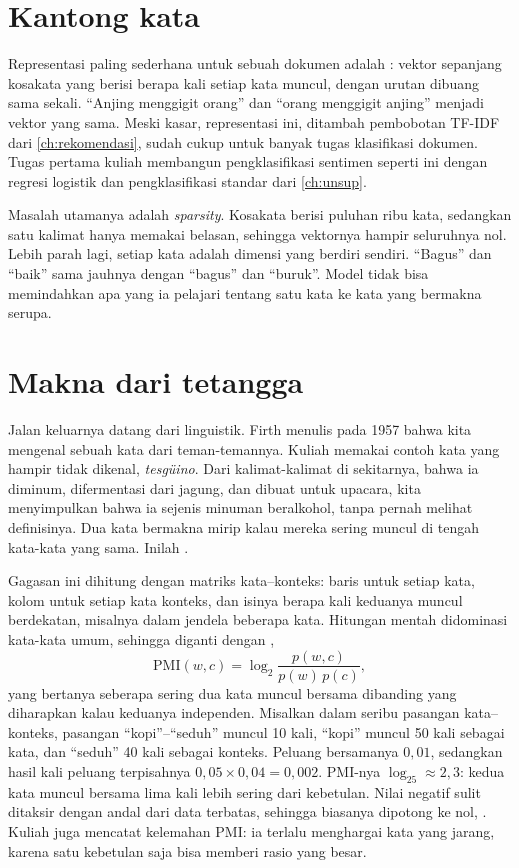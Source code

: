 \section{Kantong kata}

Representasi paling sederhana untuk sebuah dokumen adalah : vektor sepanjang kosakata yang berisi berapa
kali setiap kata muncul, dengan urutan dibuang sama sekali. ``Anjing menggigit orang'' dan ``orang menggigit anjing'' menjadi
vektor yang sama. Meski kasar, representasi ini, ditambah pembobotan TF-IDF dari \cref{ch:rekomendasi}, sudah cukup untuk banyak
tugas klasifikasi dokumen. Tugas pertama kuliah membangun pengklasifikasi sentimen seperti ini dengan regresi logistik dan
pengklasifikasi standar dari \cref{ch:unsup}.

Masalah utamanya adalah \emph{sparsity}. Kosakata berisi puluhan ribu kata, sedangkan satu kalimat hanya memakai belasan, sehingga
vektornya hampir seluruhnya nol. Lebih parah lagi, setiap kata adalah dimensi yang berdiri sendiri. ``Bagus'' dan ``baik''
sama jauhnya dengan ``bagus'' dan ``buruk''. Model tidak bisa memindahkan apa yang ia pelajari tentang satu kata ke kata yang
bermakna serupa.

\section{Makna dari tetangga}

Jalan keluarnya datang dari linguistik. Firth menulis pada 1957 bahwa kita mengenal sebuah kata dari teman-temannya. Kuliah
memakai contoh kata yang hampir tidak dikenal, \emph{tesgüino}. Dari kalimat-kalimat di sekitarnya, bahwa ia diminum, difermentasi
dari jagung, dan dibuat untuk upacara, kita menyimpulkan bahwa ia sejenis minuman beralkohol, tanpa pernah melihat definisinya.
Dua kata bermakna mirip kalau mereka sering muncul di tengah kata-kata yang sama. Inilah .

Gagasan ini dihitung dengan matriks kata--konteks: baris untuk setiap kata, kolom untuk setiap kata konteks, dan isinya berapa
kali keduanya muncul berdekatan, misalnya dalam jendela beberapa kata. Hitungan mentah didominasi kata-kata umum, sehingga
diganti dengan ,
\begin{equation}
\mathrm{PMI}(w,c)=\log_2\frac{p(w,c)}{p(w)\,p(c)},
\end{equation}
yang bertanya seberapa sering dua kata muncul bersama dibanding yang diharapkan kalau keduanya independen. Misalkan dalam seribu
pasangan kata--konteks, pasangan ``kopi''--``seduh'' muncul 10 kali, ``kopi'' muncul 50 kali sebagai kata, dan ``seduh'' 40 kali
sebagai konteks. Peluang bersamanya $0{,}01$, sedangkan hasil kali peluang terpisahnya $0{,}05\times0{,}04=0{,}002$. PMI-nya
$\log_25\approx2{,}3$: kedua kata muncul bersama lima kali lebih sering dari kebetulan. Nilai negatif sulit ditaksir dengan andal
dari data terbatas, sehingga biasanya dipotong ke nol, . Kuliah juga mencatat kelemahan PMI: ia terlalu
menghargai kata yang jarang, karena satu kebetulan saja bisa memberi rasio yang besar.

